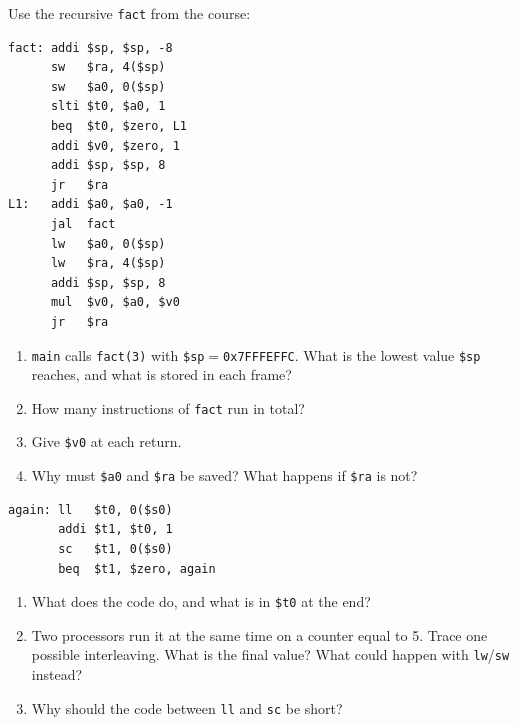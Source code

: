 \begin{exercise}\label{q:isa-fact}
Use the recursive \texttt{fact} from the course:
\begin{lstlisting}
fact: addi $sp, $sp, -8
      sw   $ra, 4($sp)
      sw   $a0, 0($sp)
      slti $t0, $a0, 1
      beq  $t0, $zero, L1
      addi $v0, $zero, 1
      addi $sp, $sp, 8
      jr   $ra
L1:   addi $a0, $a0, -1
      jal  fact
      lw   $a0, 0($sp)
      lw   $ra, 4($sp)
      addi $sp, $sp, 8
      mul  $v0, $a0, $v0
      jr   $ra
\end{lstlisting}
\begin{enumerate}[label=(\alph*),leftmargin=*]
  \item \texttt{main} calls \texttt{fact(3)} with \texttt{\$sp}$=$\texttt{0x7FFFEFFC}.
  What is the lowest value \texttt{\$sp} reaches, and what is stored in each
  frame?
  \item How many instructions of \texttt{fact} run in total?
  \item Give \texttt{\$v0} at each return.
  \item Why must \texttt{\$a0} and \texttt{\$ra} be saved? What happens if
  \texttt{\$ra} is not?
\end{enumerate}
\end{exercise}

\begin{exercise}\label{q:isa-llsc}
\leavevmode
\begin{lstlisting}
again: ll   $t0, 0($s0)
       addi $t1, $t0, 1
       sc   $t1, 0($s0)
       beq  $t1, $zero, again
\end{lstlisting}
\begin{enumerate}[label=(\alph*),leftmargin=*]
  \item What does the code do, and what is in \texttt{\$t0} at the end?
  \item Two processors run it at the same time on a counter equal to 5. Trace
  one possible interleaving. What is the final value? What could happen with
  \texttt{lw}/\texttt{sw} instead?
  \item Why should the code between \texttt{ll} and \texttt{sc} be short?
\end{enumerate}
\end{exercise}

